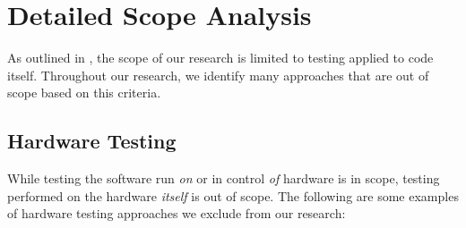 \chapter{Detailed Scope Analysis}\label{app-scope}

As outlined in , the scope of our research is limited to testing
applied to code itself. Throughout our research, we identify many
approaches that are out of scope based on this criteria.

\section{Hardware Testing}\label{hard-test}
While testing the software run \emph{on} or in control \emph{of} hardware is in
scope, testing performed on the hardware \emph{itself} is out of scope. The
following are some examples of hardware testing approaches we exclude from our
research:

